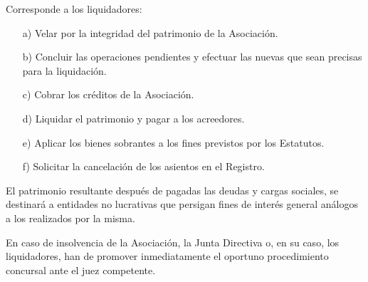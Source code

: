 \documentclass[a4paper,12pt]{article}
\theoremstyle{mystyle}		%
\begin{document}
\begin{onehalfspace}
Corresponde a los liquidadores:
\begin{itemize}
\item [a)] Velar por la integridad del patrimonio de la Asociación.
\item [b)] Concluir las operaciones pendientes y efectuar las nuevas que sean precisas para la liquidación.
\item [c)] Cobrar los créditos de la Asociación.
\item [d)] Liquidar el patrimonio y pagar a los acreedores.
\item [e)] Aplicar los bienes sobrantes a los fines previstos por los Estatutos.
\item [f)] Solicitar la cancelación de los asientos en el Registro.
\end{itemize}

El patrimonio resultante después de pagadas las deudas y cargas sociales, se destinará a entidades no lucrativas que persigan fines de interés general análogos a los realizados por la misma.

En caso de insolvencia de la Asociación, la Junta Directiva o, en su caso, los liquidadores, han de promover inmediatamente el oportuno procedimiento concursal ante el juez competente.

\end{onehalfspace}
\end{document}
